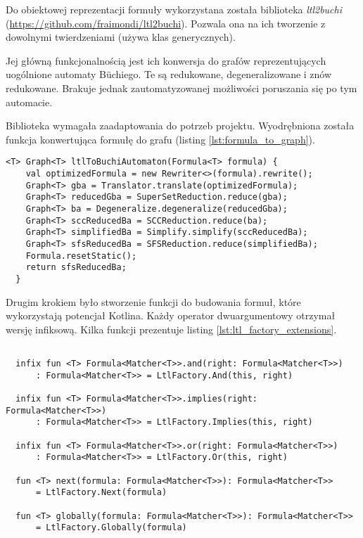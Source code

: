 Do obiektowej reprezentacji formuły wykorzystana została biblioteka \textit{ltl2buchi} \\(\url{https://github.com/fraimondi/ltl2buchi}).
Pozwala ona na ich tworzenie z dowolnymi twierdzeniami (używa klas generycznych).

Jej główną funkcjonalnością jest ich konwersja do grafów reprezentujących uogólnione automaty Büchiego.
Te są redukowane, degeneralizowane i znów redukowane.
Brakuje jednak zautomatyzowanej możliwości poruszania się po tym automacie.

Biblioteka wymagała zaadaptowania do potrzeb projektu.
Wyodrębniona została funkcja konwertująca formułę do grafu (listing \ref{lst:formula_to_graph}).

\begin{minipage}{\linewidth}
\begin{lstlisting}[caption={Funkcja konwertująca formułę LTL do grafu.},captionpos=b,label={lst:formula_to_graph}]
  <T> Graph<T> ltlToBuchiAutomaton(Formula<T> formula) {
    val optimizedFormula = new Rewriter<>(formula).rewrite();
    Graph<T> gba = Translator.translate(optimizedFormula);
    Graph<T> reducedGba = SuperSetReduction.reduce(gba);
    Graph<T> ba = Degeneralize.degeneralize(reducedGba);
    Graph<T> sccReducedBa = SCCReduction.reduce(ba);
    Graph<T> simplifiedBa = Simplify.simplify(sccReducedBa);
    Graph<T> sfsReducedBa = SFSReduction.reduce(simplifiedBa);
    Formula.resetStatic();
    return sfsReducedBa;
  }

\end{lstlisting}
\end{minipage}

Drugim krokiem było stworzenie funkcji do budowania formuł, które wykorzystają potencjał Kotlina.
Każdy operator dwuargumentowy otrzymał wersję infiksową.
Kilka funkcji prezentuje listing \ref{lst:ltl_factory_extensions}.

\begin{minipage}{\linewidth}
\begin{lstlisting}[caption={Przykładowe funkcje do budowania formuł w języku Kotlin.},captionpos=b,label={lst:ltl_factory_extensions}]

  infix fun <T> Formula<Matcher<T>>.and(right: Formula<Matcher<T>>)
      : Formula<Matcher<T>> = LtlFactory.And(this, right)

  infix fun <T> Formula<Matcher<T>>.implies(right: Formula<Matcher<T>>)
      : Formula<Matcher<T>> = LtlFactory.Implies(this, right)

  infix fun <T> Formula<Matcher<T>>.or(right: Formula<Matcher<T>>)
      : Formula<Matcher<T>> = LtlFactory.Or(this, right)

  fun <T> next(formula: Formula<Matcher<T>>): Formula<Matcher<T>>
      = LtlFactory.Next(formula)

  fun <T> globally(formula: Formula<Matcher<T>>): Formula<Matcher<T>>
      = LtlFactory.Globally(formula)

\end{lstlisting}
\end{minipage}

